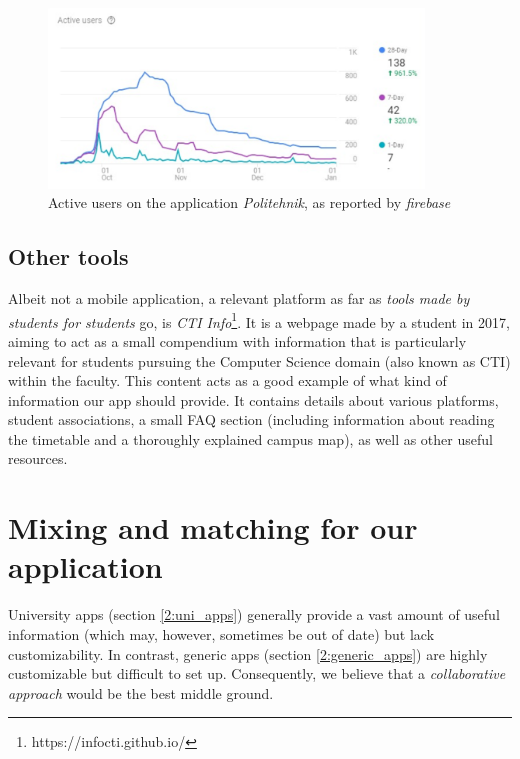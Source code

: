     \begin{figure}[ht]
        \centering
             \includegraphics[width=0.89\textwidth]{figures/charts/politehnik_usage.png}
        \caption{Active users on the application \textit{Politehnik}, as reported by \textit{\gls{firebase}}}
        \label{2:fig:politehnik_usage}
    \end{figure}
    
    \subsection{Other tools} \label{2:existing_apps_other}
    Albeit not a mobile application, a relevant platform as far as \textit{tools made by students for students} go, is \textit{CTI Info}\footnote{https://infocti.github.io/}. It is a webpage made by a student in 2017, aiming to act as a small compendium with information that is particularly relevant for students pursuing the Computer Science domain (also known as CTI) within the faculty. This content acts as a good example of what kind of information our app should provide. It contains details about various platforms, student associations, a small FAQ section (including information about reading the timetable and a thoroughly explained campus map), as well as other useful resources.

\section{Mixing and matching for our application} \label{2:mix_and_match}

    University apps (section \ref{2:uni_apps}) generally provide a vast amount of useful information (which may, however, sometimes be out of date) but lack customizability. In contrast, generic apps (section \ref{2:generic_apps}) are highly customizable but difficult to set up. Consequently, we believe that a \textit{collaborative approach} would be the best middle ground.
    
